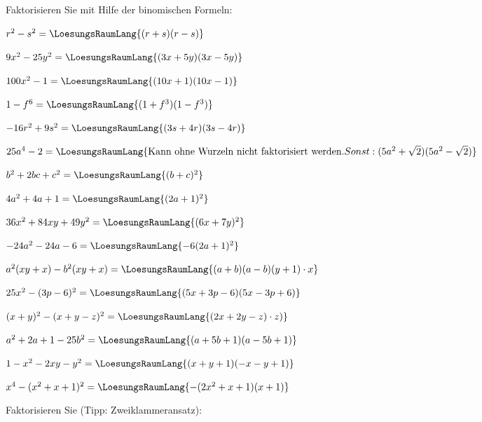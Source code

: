 \newpage





Faktorisieren Sie mit Hilfe der binomischen Formeln:


\begin{bbwAufgabenBlock}
\item $r^2-s^2 = \LoesungsRaumLang{(r+s)(r-s)}$
\item $9x^2 - 25y^2 = \LoesungsRaumLang{(3x+5y)(3x-5y)}$
\item $100x^2 -1 = \LoesungsRaumLang{(10x+1)(10x-1)}$
\item $1-f^6 = \LoesungsRaumLang{(1+f^3)(1-f^3)}$\noTRAINER{\newpage}
\item $-16r^2 + 9s^2 = \LoesungsRaumLang{(3s+4r)(3s-4r)}$
\item $25a^4-2 =  \LoesungsRaumLang{\textrm{Kann ohne Wurzeln nicht faktorisiert werden}. Sonst: (5a^2 + \sqrt{2})(5a^2-\sqrt{2})}$
\item $b^2+2bc+c^2 = \LoesungsRaumLang{(b+c)^2}$
\item $4a^2+4a+1 = \LoesungsRaumLang{(2a+1)^2}$\noTRAINER{\newpage}
\item $36x^2 + 84xy + 49y^2 = \LoesungsRaumLang{(6x+7y)^2}$
\item $-24a^2 - 24a -6 = \LoesungsRaumLang{-6(2a+1)^2}$
\item $a^2(xy+x) - b^2(xy+x) = \LoesungsRaumLang{(a+b)(a-b)(y+1)\cdot{}x}$
\item $25x^2 - (3p-6)^2 = \LoesungsRaumLang{(5x+3p-6)(5x-3p+6)}$\noTRAINER{\newpage}
\item $(x+y)^2 - (x+y-z)^2 = \LoesungsRaumLang{(2x+2y-z)\cdot{}z)}$
\item $a^2+2a+1-25b^2 = \LoesungsRaumLang{(a+5b+1)(a-5b+1)}$
\item $1-x^2-2xy-y^2 = \LoesungsRaumLang{(x+y+1)(-x-y+1)}$
\item $x^4 - (x^2+x+1)^2 = \LoesungsRaumLang{-(2x^2+x+1)(x+1)}$
\end{bbwAufgabenBlock}

\newpage




Faktorisieren Sie (Tipp: Zweiklammeransatz):



